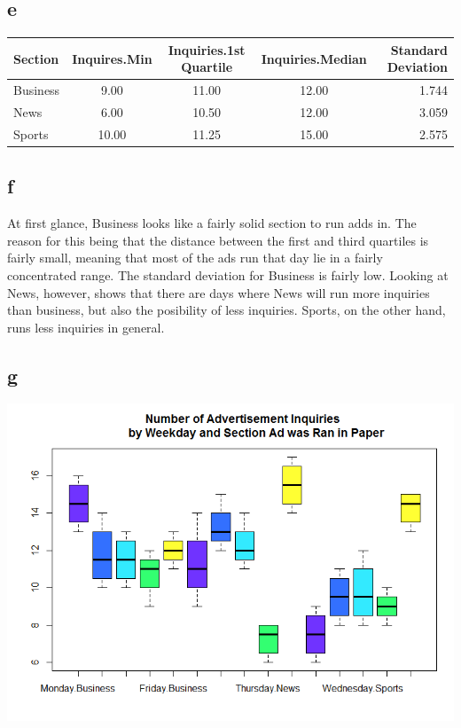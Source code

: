 \documentclass[10pt,letterpaper]{article}
\begin{document}
\subsection*{e}
\begin{tabular}{ l | c | c | c | r }
	Section & Inquires.Min & Inquiries.1st Quartile & Inquiries.Median & Standard Deviation\\ \hline
	Business & 9.00 & 11.00 & 12.00 & 1.744 \\ \hline
	News & 6.00 & 10.50 & 12.00 & 3.059 \\ \hline
	Sports & 10.00 & 11.25 & 15.00 & 2.575 \\ 
\end{tabular}

\subsection*{f}
At first glance, Business looks like a fairly solid section to run adds in.
The reason for this being that the distance between the first and third
quartiles is fairly small, meaning that most of the ads run that day lie in a
fairly concentrated range. The standard deviation for Business is fairly low.
Looking at News, however, shows that there are days where News will run more
inquiries than business, but also the posibility of less inquiries. Sports, on
the other hand, runs less inquiries in general.
\subsection*{g}
\includegraphics[scale=.5]{multiBox}
\end{document}
